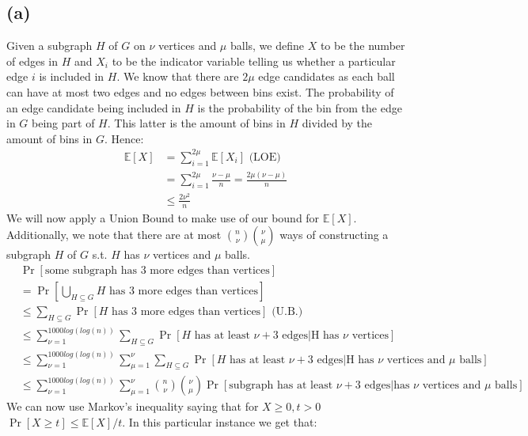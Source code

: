 \documentclass[a4paper,german]{article}
\newcommand{\E}{\mathbb{E}}
\begin{document}
\subsection*{(a)}
	Given a subgraph \(H\) of \(G\) on \(\nu\) vertices and \(\mu\) balls, we define \(X\) to be the number of edges in \(H\) and \(X_i\) to be the indicator variable telling us whether a particular edge \(i\) is included in \(H\). We know that there are \(2\mu\) edge candidates as each ball can have at most two edges and no edges between bins exist. The probability of an edge candidate being included in \(H\) is the probability of the bin from the edge in \(G\) being part of \(H\). This latter is the amount of bins in \(H\) divided by the amount of bins in \(G\). Hence:
	\begin{align*}
		\E[X] &= \sum_{i=1}^{2\mu} \E[X_i] \text{ (LOE)} \\
		&= \sum_{i=1}^{2\mu} \frac{\nu - \mu}{n} = \frac{2\mu(\nu - \mu)}{n} \\
		&\leq \frac{2 \nu^2}{n}
	\end{align*}
	We will now apply a Union Bound to make use of our bound for \(\E[X]\). Additionally, we note that there are at most \({n \choose \nu}{\nu \choose \mu}\) ways of constructing a subgraph \(H\) of \(G\) s.t. \(H\) has \(\nu\) vertices and \(\mu\) balls. 
	\begin{align*}
		& \Pr[\text{some subgraph has 3 more edges than vertices}] \\
		&= \Pr[ \bigcup_{H \subseteq G} H \text{ has 3 more edges than vertices}] \\
		&\leq \sum_{H \subseteq G}  \Pr[ H \text{ has 3 more edges than vertices}]  \text{ (U.B.)} \\
		&\leq \sum_{\nu = 1}^{1000 log(log(n))} \sum_{H \subseteq G}  \Pr[H \text { has at least } \nu + 3 \text{ edges} | \text{H has } \nu \text{ vertices}]\\
		&\leq \sum_{\nu = 1}^{1000 log(log(n))} \sum_{\mu = 1}^{\nu} \sum_{H \subseteq G}  \Pr[H \text { has at least } \nu + 3 \text{ edges} | \text{H has } \nu \text{ vertices and } \mu \text{ balls}] \\
		&\leq \sum_{\nu = 1}^{1000 log(log(n))} \sum_{\mu = 1}^{\nu} {n \choose \nu} {\nu \choose \mu} \Pr[\text {subgraph has at least } \nu + 3 \text{ edges} |  \text{has } \nu \text{ vertices and } \mu \text{ balls}]
	\end{align*}
	We can now use Markov's inequality saying that for \(X \geq 0, t >0\) \(\Pr[X \geq t] \leq \E[X] / t\). In this particular instance we get that:
\end{document}
